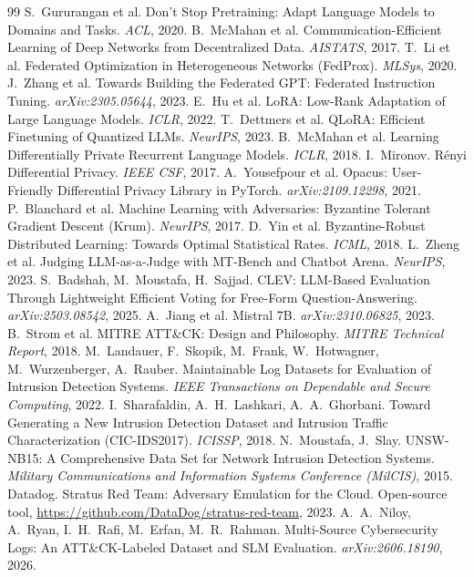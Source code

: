 \documentclass[11pt,a4paper]{article}
\begin{document}
\begin{thebibliography}{99}
 S.~Gururangan et al. Don't Stop Pretraining: Adapt Language Models to Domains and Tasks. \emph{ACL}, 2020.
 B.~McMahan et al. Communication-Efficient Learning of Deep Networks from Decentralized Data. \emph{AISTATS}, 2017.
 T.~Li et al. Federated Optimization in Heterogeneous Networks (FedProx). \emph{MLSys}, 2020.
 J.~Zhang et al. Towards Building the Federated GPT: Federated Instruction Tuning. \emph{arXiv:2305.05644}, 2023.
 E.~Hu et al. LoRA: Low-Rank Adaptation of Large Language Models. \emph{ICLR}, 2022.
 T.~Dettmers et al. QLoRA: Efficient Finetuning of Quantized LLMs. \emph{NeurIPS}, 2023.
 B.~McMahan et al. Learning Differentially Private Recurrent Language Models. \emph{ICLR}, 2018.
 I.~Mironov. R\'enyi Differential Privacy. \emph{IEEE CSF}, 2017.
 A.~Yousefpour et al. Opacus: User-Friendly Differential Privacy Library in PyTorch. \emph{arXiv:2109.12298}, 2021.
 P.~Blanchard et al. Machine Learning with Adversaries: Byzantine Tolerant Gradient Descent (Krum). \emph{NeurIPS}, 2017.
 D.~Yin et al. Byzantine-Robust Distributed Learning: Towards Optimal Statistical Rates. \emph{ICML}, 2018.
 L.~Zheng et al. Judging LLM-as-a-Judge with MT-Bench and Chatbot Arena. \emph{NeurIPS}, 2023.
 S.~Badshah, M.~Moustafa, H.~Sajjad. CLEV: LLM-Based Evaluation Through Lightweight Efficient Voting for Free-Form Question-Answering. \emph{arXiv:2503.08542}, 2025.
 A.~Jiang et al. Mistral 7B. \emph{arXiv:2310.06825}, 2023.
 B.~Strom et al. MITRE ATT\&CK: Design and Philosophy. \emph{MITRE Technical Report}, 2018.
 M.~Landauer, F.~Skopik, M.~Frank, W.~Hotwagner, M.~Wurzenberger, A.~Rauber. Maintainable Log Datasets for Evaluation of Intrusion Detection Systems. \emph{IEEE Transactions on Dependable and Secure Computing}, 2022.
 I.~Sharafaldin, A.~H.~Lashkari, A.~A.~Ghorbani. Toward Generating a New Intrusion Detection Dataset and Intrusion Traffic Characterization (CIC-IDS2017). \emph{ICISSP}, 2018.
 N.~Moustafa, J.~Slay. UNSW-NB15: A Comprehensive Data Set for Network Intrusion Detection Systems. \emph{Military Communications and Information Systems Conference (MilCIS)}, 2015.
 Datadog. Stratus Red Team: Adversary Emulation for the Cloud. Open-source tool, \url{https://github.com/DataDog/stratus-red-team}, 2023.
 A.~A.~Niloy, A.~Ryan, I.~H.~Rafi, M.~Erfan, M.~R.~Rahman. Multi-Source Cybersecurity Logs: An ATT\&CK-Labeled Dataset and SLM Evaluation. \emph{arXiv:2606.18190}, 2026.
\end{thebibliography}
\end{document}
